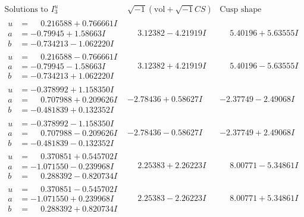 \documentclass[1p]{elsarticle_modified}
\theoremstyle{definition}
\newcommand{\I}{\sqrt{-1}}
\begin{document}
$$\begin{array}{c|c|c}  
\text{Solutions to }I^u_{3}& \I (\text{vol} + \sqrt{-1}CS) & \text{Cusp shape}\\
 \hline 
\begin{aligned}
u &= \phantom{-}0.216588 + 0.766661 I \\
a &= -0.79945 + 1.58663 I \\
b &= -0.734213 - 1.062220 I\end{aligned}
 & \phantom{-}3.12382 - 4.21919 I & \phantom{-}5.40196 + 5.63555 I \\ \hline\begin{aligned}
u &= \phantom{-}0.216588 - 0.766661 I \\
a &= -0.79945 - 1.58663 I \\
b &= -0.734213 + 1.062220 I\end{aligned}
 & \phantom{-}3.12382 + 4.21919 I & \phantom{-}5.40196 - 5.63555 I \\ \hline\begin{aligned}
u &= -0.378992 + 1.158350 I \\
a &= \phantom{-}0.707988 + 0.209626 I \\
b &= -0.481839 + 0.132352 I\end{aligned}
 & -2.78436 + 0.58627 I & -2.37749 - 2.49068 I \\ \hline\begin{aligned}
u &= -0.378992 - 1.158350 I \\
a &= \phantom{-}0.707988 - 0.209626 I \\
b &= -0.481839 - 0.132352 I\end{aligned}
 & -2.78436 - 0.58627 I & -2.37749 + 2.49068 I \\ \hline\begin{aligned}
u &= \phantom{-}0.370851 + 0.545702 I \\
a &= -1.071550 - 0.239968 I \\
b &= \phantom{-}0.288392 - 0.820734 I\end{aligned}
 & \phantom{-}2.25383 + 2.26223 I & \phantom{-}8.00771 - 5.34861 I \\ \hline\begin{aligned}
u &= \phantom{-}0.370851 - 0.545702 I \\
a &= -1.071550 + 0.239968 I \\
b &= \phantom{-}0.288392 + 0.820734 I\end{aligned}
 & \phantom{-}2.25383 - 2.26223 I & \phantom{-}8.00771 + 5.34861 I \\ \hline\begin{aligned}

\end{aligned}
\end{array}$$
\end{document}
